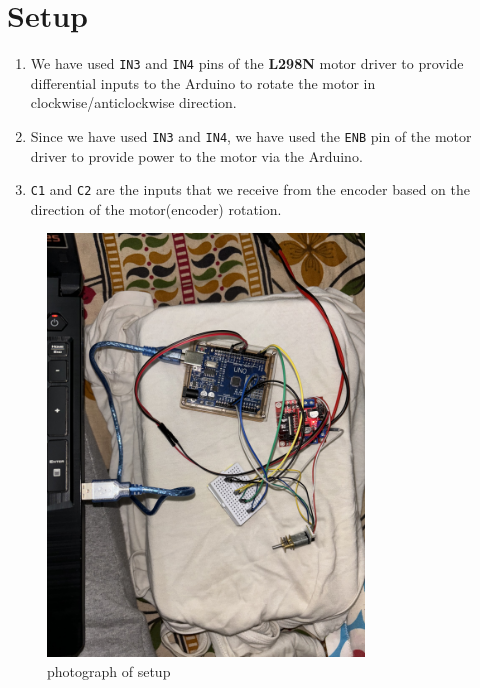 \documentclass[12pt]{article}
\begin{document}
\pagebreak

\section{Setup}
\begin{enumerate}
    \item We have used \texttt{IN3} and \texttt{IN4} pins of the \textbf{\textbf{L298N}} motor driver to provide differential inputs to the Arduino to rotate the motor in clockwise/anticlockwise direction.
    \item Since we have used \texttt{IN3} and \texttt{IN4}, we have used the \texttt{\texttt{ENB}} pin of the motor driver to provide power to the motor via the Arduino.
    \item \texttt{\texttt{C1}} and \texttt{\texttt{C2}} are the inputs that we receive from the encoder based on the direction of the motor(encoder) rotation.
\end{enumerate}

\begin{figure}[ht!]
    \centering
    \includegraphics[width=0.75\textwidth]{images/setup.jpeg}
    \caption{photograph of setup}
\end{figure}
\end{document}

